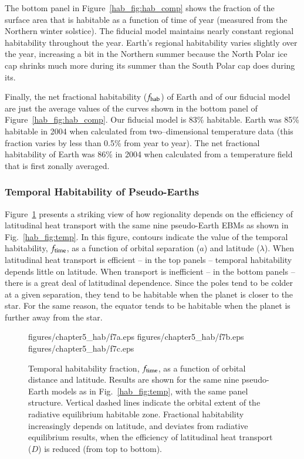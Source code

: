 The bottom panel in Figure~\ref{hab_fig:hab_comp} shows the fraction
of the surface area that is habitable as a function of time of year
(measured from the Northern winter solstice).  The fiducial model
maintains nearly constant regional habitability throughout the year.
Earth's regional habitability varies slightly over the year,
increasing a bit in the Northern summer because the North Polar ice
cap shrinks much more during its summer than the South Polar cap does
during its.

Finally, the net fractional habitability ($f_{\rm hab}$) of Earth and
of our fiducial model are just the average values of the curves shown
in the bottom panel of Figure~\ref{hab_fig:hab_comp}.  Our fiducial
model is 83\% habitable. Earth was 85\% habitable in 2004 when
calculated from two--dimensional temperature data (this fraction
varies by less than 0.5\% from year to year). The net fractional
habitability of Earth was 86\% in 2004 when calculated from a
temperature field that is first zonally averaged.


\subsubsection{Temporal Habitability of Pseudo-Earths}
\label{hab_sssec:f_time}

Figure~\ref{hab_fig:time hab} presents a striking view of how
regionality depends on the efficiency of latitudinal heat transport
with the same nine pseudo-Earth EBMs as shown in
Fig.~\ref{hab_fig:temp}.  In this figure, contours indicate the value
of the temporal habitability, $f_{\rm time}$, as a function of orbital
separation ($a$) and latitude ($\lambda$).  When latitudinal heat
transport is efficient -- in the top panels -- temporal habitability
depends little on latitude.  When transport is inefficient -- in the
bottom panels -- there is a great deal of latitudinal dependence.
Since the poles tend to be colder at a given separation, they tend to
be habitable when the planet is closer to the star.  For the same
reason, the equator tends to be habitable when the planet is further
away from the star.
\begin{figure}[p]
\plotthree
{figures/chapter5_hab/f7a.eps}
{figures/chapter5_hab/f7b.eps}
{figures/chapter5_hab/f7c.eps}
\caption[Temporal habitability fraction, $f_{\rm time}$, as a function
of orbital distance and latitude.]{Temporal habitability fraction,
$f_{\rm time}$, as a function of orbital distance and
latitude. Results are shown for the same nine pseudo-Earth models as
in Fig.~\ref{hab_fig:temp}, with the same panel structure.  Vertical
dashed lines indicate the orbital extent of the radiative equilibrium
habitable zone.  Fractional habitability increasingly depends on
latitude, and deviates from radiative equilibrium results, when the
efficiency of latitudinal heat transport ($D$) is reduced (from top to
bottom).}
\label{hab_fig:time hab}
\end{figure}
\afterpage{\clearpage}

